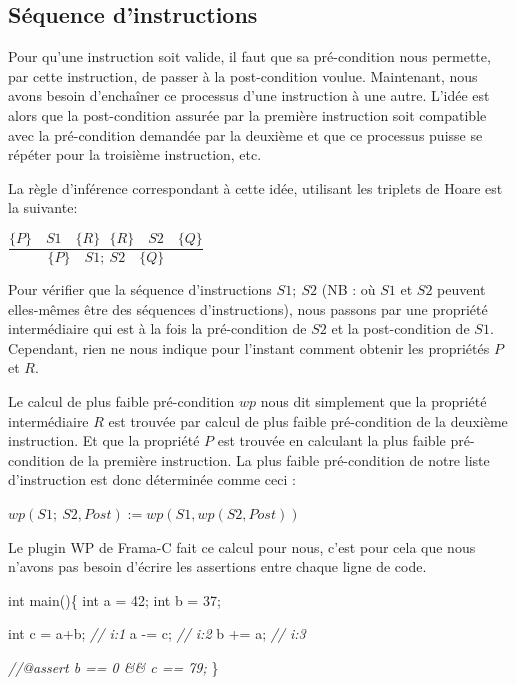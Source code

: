 \documentclass[12pt,francais,]{scrbook}
\newenvironment{Shaded}{}{}
\newcommand{\DataTypeTok}[1]{\textcolor[rgb]{0.56,0.13,0.00}{{#1}}}
\newcommand{\DecValTok}[1]{\textcolor[rgb]{0.25,0.63,0.44}{{#1}}}
\newcommand{\CommentTok}[1]{\textcolor[rgb]{0.38,0.63,0.69}{\textit{{#1}}}}
\newcommand{\NormalTok}[1]{{#1}}
\begin{document}
\subsection{Séquence d'instructions}\label{suxe9quence-dinstructions}

Pour qu'une instruction soit valide, il faut que sa pré-condition nous
permette, par cette instruction, de passer à la post-condition voulue.
Maintenant, nous avons besoin d'enchaîner ce processus d'une instruction
à une autre. L'idée est alors que la post-condition assurée par la
première instruction soit compatible avec la pré-condition demandée par
la deuxième et que ce processus puisse se répéter pour la troisième
instruction, etc.

La règle d'inférence correspondant à cette idée, utilisant les triplets
de Hoare est la suivante:

\begin{center}
\(\dfrac{\{P\}\quad S1 \quad \{R\} \ \ \ \{R\}\quad S2 \quad \{Q\}}{\{P\}\quad S1 ;\ S2 \quad \{Q\}}\)
\end{center}

Pour vérifier que la séquence d'instructions \(S1;\ S2\) (NB : où \(S1\)
et \(S2\) peuvent elles-mêmes être des séquences d'instructions), nous
passons par une propriété intermédiaire qui est à la fois la
pré-condition de \(S2\) et la post-condition de \(S1\). Cependant, rien
ne nous indique pour l'instant comment obtenir les propriétés \(P\) et
\(R\).

Le calcul de plus faible pré-condition \(wp\) nous dit simplement que la
propriété intermédiaire \(R\) est trouvée par calcul de plus faible
pré-condition de la deuxième instruction. Et que la propriété \(P\) est
trouvée en calculant la plus faible pré-condition de la première
instruction. La plus faible pré-condition de notre liste d'instruction
est donc déterminée comme ceci :

\begin{center} \(wp(S1;\ S2 , Post) := wp(S1, wp(S2, Post) )\)
\end{center}

Le plugin WP de Frama-C fait ce calcul pour nous, c'est pour cela que
nous n'avons pas besoin d'écrire les assertions entre chaque ligne de
code.

\begin{footnotesize}\begin{Shaded}
\begin{Highlighting}[]
\DataTypeTok{int} \NormalTok{main()\{}
  \DataTypeTok{int} \NormalTok{a = }\DecValTok{42}\NormalTok{;}
  \DataTypeTok{int} \NormalTok{b = }\DecValTok{37}\NormalTok{;}

  \DataTypeTok{int} \NormalTok{c = a+b; }\CommentTok{// i:1}
  \NormalTok{a -= c;      }\CommentTok{// i:2}
  \NormalTok{b += a;      }\CommentTok{// i:3}

  \CommentTok{//@assert b == 0 && c == 79;}
\NormalTok{\}}
\end{Highlighting}
\end{Shaded}\end{footnotesize}
\end{document}
